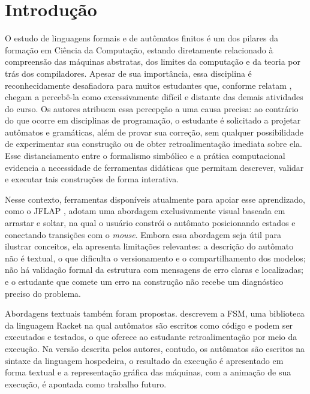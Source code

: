 \documentclass[
    12pt
    ,oneside
    ,a4paper
    ,chapter=TITLE
    ,section=TITLE
    ,sumario=abnt-6027-2012]{abntex2}
\begin{document}
\textual

\chapter{Introdução}
\label{cap:introducao}

O estudo de linguagens formais e de autômatos finitos é um dos pilares da
formação em Ciência da Computação, estando diretamente relacionado à compreensão
das máquinas abstratas, dos limites da computação e da teoria por trás dos
compiladores. Apesar de sua importância, essa disciplina é reconhecidamente
desafiadora para muitos estudantes que, conforme relatam ,
chegam a percebê-la como excessivamente difícil e distante das demais atividades do
curso. Os autores atribuem essa
percepção a uma causa precisa: ao contrário do que ocorre em disciplinas de
programação, o estudante é solicitado a projetar autômatos e gramáticas, além de
provar sua correção, sem qualquer possibilidade de experimentar sua construção ou de
obter retroalimentação imediata sobre ela. Esse distanciamento entre o formalismo
simbólico e a prática computacional evidencia a necessidade de ferramentas didáticas
que permitam descrever, validar e executar tais construções de forma interativa.

Nesse contexto, ferramentas disponíveis atualmente para apoiar esse aprendizado, como
o JFLAP \cite{rodger2006jflap}, adotam uma abordagem exclusivamente visual
baseada em arrastar e soltar, na qual o usuário constrói o autômato posicionando
estados e conectando transições com o \textit{mouse}. Embora essa abordagem seja útil
para ilustrar conceitos, ela apresenta limitações relevantes: a descrição do autômato
não é textual, o que dificulta o versionamento e o compartilhamento dos modelos; não
há validação formal da estrutura com mensagens de erro claras e localizadas; e o
estudante que comete um erro na construção não recebe um diagnóstico preciso do
problema.

Abordagens textuais também foram propostas.  descrevem a FSM,
uma biblioteca da linguagem Racket na qual autômatos são escritos como código e podem ser
executados e testados, o que oferece ao estudante retroalimentação por meio da execução.
Na versão descrita pelos autores, contudo, os autômatos são escritos na sintaxe da
linguagem hospedeira, o resultado da execução é apresentado em forma textual e a
representação gráfica das máquinas, com a animação de sua execução, é apontada como
trabalho futuro.
\end{document}
